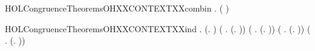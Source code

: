 \newcommand{\HOLCongruenceTheoremsOHXXCONTEXTXXcases}{\UseVerbatim{HOLCongruenceTheoremsOHXXCONTEXTXXcases}}
\begin{SaveVerbatim}{HOLCongruenceTheoremsOHXXCONTEXTXXcombin}
\HOLTokenTurnstile{} \HOLSymConst{\HOLTokenForall{}} .   \HOLSymConst{\HOLTokenConj{}}   \HOLSymConst{\HOLTokenImp{}}  ( \HOLConst{\HOLTokenCompose} )
\end{SaveVerbatim}
\newcommand{\HOLCongruenceTheoremsOHXXCONTEXTXXcombin}{\UseVerbatim{HOLCongruenceTheoremsOHXXCONTEXTXXcombin}}
\begin{SaveVerbatim}{HOLCongruenceTheoremsOHXXCONTEXTXXind}
\HOLTokenTurnstile{} \HOLSymConst{\HOLTokenForall{}}.
        (\HOLTokenLambda{}. ) \HOLSymConst{\HOLTokenConj{}}
       (\HOLSymConst{\HOLTokenForall{}} .   \HOLSymConst{\HOLTokenImp{}}  (\HOLTokenLambda{}.  )) \HOLSymConst{\HOLTokenConj{}}
       (\HOLSymConst{\HOLTokenForall{}} .   \HOLSymConst{\HOLTokenImp{}}  (\HOLTokenLambda{}.   \HOLSymConst{\ensuremath{+}} )) \HOLSymConst{\HOLTokenConj{}}
       (\HOLSymConst{\HOLTokenForall{}} .   \HOLSymConst{\HOLTokenImp{}}  (\HOLTokenLambda{}.  \HOLSymConst{\ensuremath{+}}  )) \HOLSymConst{\HOLTokenConj{}}
       (\HOLSymConst{\HOLTokenForall{}} .   \HOLSymConst{\HOLTokenImp{}}  (\HOLTokenLambda{}.   \HOLSymConst{\ensuremath{\parallel}} )) \HOLSymConst{\HOLTokenConj{}}

\end{SaveVerbatim}
